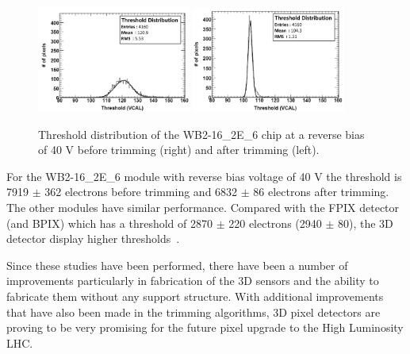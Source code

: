 \begin{figure}[htb!]
\begin{center}
\centerline{
\includegraphics[width=0.45\textwidth]{3D/threshold1.pdf}
\includegraphics[width=0.45\textwidth]{3D/threshold2.pdf}
}
\caption{Threshold distribution of the WB2-16\_2E\_6 chip at a reverse bias of
40 V before trimming (right) and after trimming (left).~\cite{5734879} }
\label{fig:threshold}
\end{center}
\end{figure}

For the WB2-16\_2E\_6 module with reverse bias voltage of 40 V the threshold is 7919 $\pm$ 362 electrons before trimming and 6832 $\pm$ 86 electrons after trimming. The other modules have similar performance. Compared with the FPIX detector (and BPIX) which has a threshold of 2870 $\pm$ 220 electrons (2940 $\pm$ 80), the 3D detector display higher thresholds~\cite{CMSpixel}.

Since these studies have been performed, there have been a number of improvements particularly in fabrication of the 3D sensors and the ability to fabricate them without any support structure.  With additional improvements that have also been made in the trimming algorithms, 3D pixel detectors are proving to be very promising for the future pixel upgrade to the High Luminosity LHC.  
